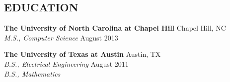 \documentclass[line,margin]{res}
\begin{document}
\address{2036 Amur Drive, Austin, TX 78745 - 512.739.9634 - alfremir@gmail.com}

\begin{resume}
 
\section{EDUCATION} 
  {\bf The University of North Carolina at Chapel Hill} 
  \hfill Chapel Hill, NC \\
  \emph{M.S., Computer Science} \hfill August 2013

  {\bf The University of Texas at Austin} \hfill Austin, TX \\
  \emph{B.S., Electrical Engineering} \hfill  August 2011 \\
  \emph{B.S., Mathematics}
 

\end{resume}
\end{document}
